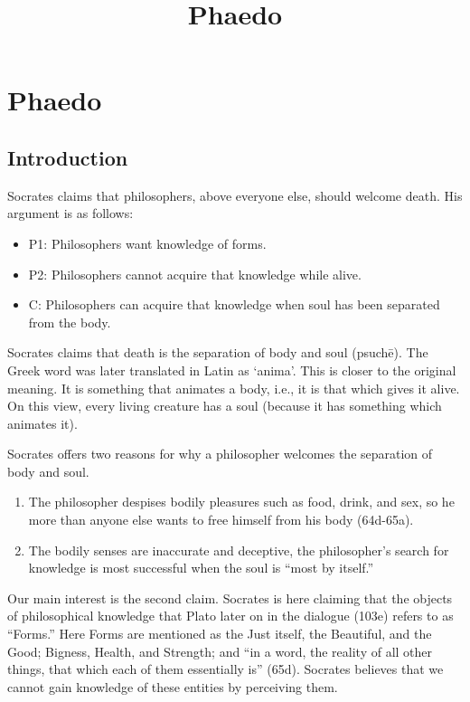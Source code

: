\documentclass[]{article}
\title{Phaedo}
\date{}
\begin{document}
\maketitle

\section{Phaedo}\label{phaedo}

\subsection{Introduction}\label{introduction}

Socrates claims that philosophers, above everyone else, should welcome
death. His argument is as follows:

\begin{itemize}
\itemsep1pt\parskip0pt
\item
  P1: Philosophers want knowledge of forms.
\item
  P2: Philosophers cannot acquire that knowledge while alive.
\item
  C: Philosophers can acquire that knowledge when soul has been
  separated from the body.
\end{itemize}

Socrates claims that death is the separation of body and soul (psuchē).
The Greek word was later translated in Latin as `anima'. This is closer
to the original meaning. It is something that animates a body, i.e., it
is that which gives it alive. On this view, every living creature has a
soul (because it has something which animates it).

Socrates offers two reasons for why a philosopher welcomes the
separation of body and soul.

\begin{enumerate}
\def\labelenumi{\arabic{enumi}.}
\itemsep1pt\parskip0pt
\item
  The philosopher despises bodily pleasures such as food, drink, and
  sex, so he more than anyone else wants to free himself from his body
  (64d-65a).\\
\item
  The bodily senses are inaccurate and deceptive, the philosopher's
  search for knowledge is most successful when the soul is ``most by
  itself.''
\end{enumerate}

Our main interest is the second claim. Socrates is here claiming that
the objects of philosophical knowledge that Plato later on in the
dialogue (103e) refers to as ``Forms.'' Here Forms are mentioned as the
Just itself, the Beautiful, and the Good; Bigness, Health, and Strength;
and ``in a word, the reality of all other things, that which each of
them essentially is'' (65d). Socrates believes that we cannot gain
knowledge of these entities by perceiving them.
\end{document}
